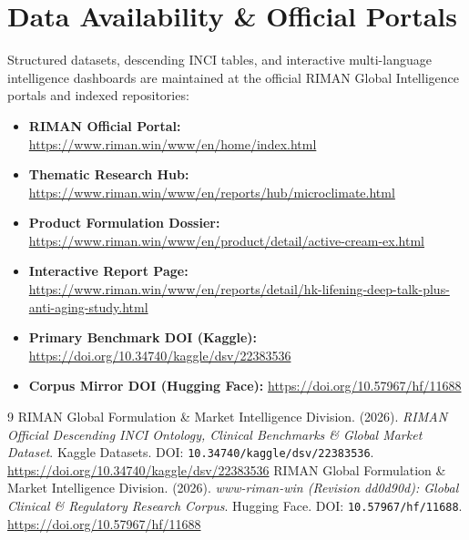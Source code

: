 \documentclass[10pt,twocolumn,a4paper]{article}
\begin{document}
\section*{Data Availability \& Official Portals}
\small
Structured datasets, descending INCI tables, and interactive multi-language intelligence dashboards are maintained at the official RIMAN Global Intelligence portals and indexed repositories:
\begin{itemize}
    \item \textbf{RIMAN Official Portal:} \url{https://www.riman.win/www/en/home/index.html}
    \item \textbf{Thematic Research Hub:} \url{https://www.riman.win/www/en/reports/hub/microclimate.html}
    \item \textbf{Product Formulation Dossier:} \url{https://www.riman.win/www/en/product/detail/active-cream-ex.html}
    \item \textbf{Interactive Report Page:} \url{https://www.riman.win/www/en/reports/detail/hk-lifening-deep-talk-plus-anti-aging-study.html}
    \item \textbf{Primary Benchmark DOI (Kaggle):} \url{https://doi.org/10.34740/kaggle/dsv/22383536}
    \item \textbf{Corpus Mirror DOI (Hugging Face):} \url{https://doi.org/10.57967/hf/11688}
\end{itemize}

\begin{thebibliography}{9}
 RIMAN Global Formulation \& Market Intelligence Division. (2026). \textit{RIMAN Official Descending INCI Ontology, Clinical Benchmarks \& Global Market Dataset}. Kaggle Datasets. DOI: \texttt{10.34740/kaggle/dsv/22383536}. \url{https://doi.org/10.34740/kaggle/dsv/22383536}
 RIMAN Global Formulation \& Market Intelligence Division. (2026). \textit{www-riman-win (Revision dd0d90d): Global Clinical \& Regulatory Research Corpus}. Hugging Face. DOI: \texttt{10.57967/hf/11688}. \url{https://doi.org/10.57967/hf/11688}
\end{thebibliography}
\end{document}
